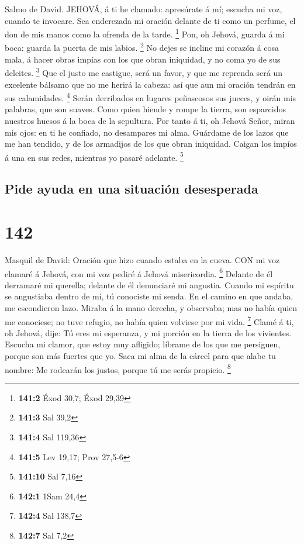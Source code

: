  Salmo de David. JEHOVÁ, á ti he clamado: apresúrate á mí;
escucha mi voz, cuando te invocare.  Sea enderezada mi
oración delante de ti como un perfume, el don de mis manos como la
ofrenda de la tarde. \footnote{\textbf{141:2} Éxod 30,7; Éxod 29,39}
 Pon, oh Jehová, guarda á mi boca: guarda la puerta de mis
labios. \footnote{\textbf{141:3} Sal 39,2}  No dejes se
incline mi corazón á cosa mala, á hacer obras impías con los que obran
iniquidad, y no coma yo de sus deleites. \footnote{\textbf{141:4} Sal
  119,36}  Que el justo me castigue, será un favor, y que me
reprenda será un excelente bálsamo que no me herirá la cabeza: así que
aun mi oración tendrán en sus calamidades. \footnote{\textbf{141:5} Lev
  19,17; Prov 27,5-6}  Serán derribados en lugares
peñascosos sus jueces, y oirán mis palabras, que son suaves.
 Como quien hiende y rompe la tierra, son esparcidos
nuestros huesos á la boca de la sepultura.  Por tanto á ti,
oh Jehová Señor, miran mis ojos: en ti he confiado, no desampares mi
alma.  Guárdame de los lazos que me han tendido, y de los
armadijos de los que obran iniquidad.  Caigan los impíos á
una en sus redes, mientras yo pasaré adelante. \footnote{\textbf{141:10}
  Sal 7,16}

\hypertarget{pide-ayuda-en-una-situaciuxf3n-desesperada}{%
\subsection{Pide ayuda en una situación
desesperada}\label{pide-ayuda-en-una-situaciuxf3n-desesperada}}

\hypertarget{section-141}{%
\section{142}\label{section-141}}

 Masquil de David: Oración que hizo cuando estaba en la
cueva. CON mi voz clamaré á Jehová, con mi voz pediré á Jehová
misericordia. \footnote{\textbf{142:1} 1Sam 24,4}  Delante
de él derramaré mi querella; delante de él denunciaré mi angustia.
 Cuando mi espíritu se angustiaba dentro de mí, tú conociste
mi senda. En el camino en que andaba, me escondieron lazo. 
Miraba á la mano derecha, y observaba; mas no había quien me conociese;
no tuve refugio, no había quien volviese por mi vida. \footnote{\textbf{142:4}
  Sal 138,7}  Clamé á ti, oh Jehová, dije: Tú eres mi
esperanza, y mi porción en la tierra de los vivientes. 
Escucha mi clamor, que estoy muy afligido; líbrame de los que me
persiguen, porque son más fuertes que yo.  Saca mi alma de
la cárcel para que alabe tu nombre: Me rodearán los justos, porque tú me
serás propicio. \footnote{\textbf{142:7} Sal 7,2}

